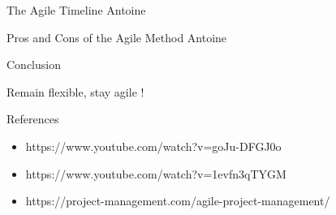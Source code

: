 \documentclass[10pt]{beamer}
\begin{document}
\begin{frame}{The Agile Timeline}
    Antoine
\end{frame}

\begin{frame}{Pros and Cons of the Agile Method}
    Antoine
\end{frame}

\begin{frame}{Conclusion}

  Remain flexible, stay agile !
  
\end{frame}

\begin{frame}{References}
  \begin{itemize}
    \item https://www.youtube.com/watch?v=goJu-DFGJ0o
    \item https://www.youtube.com/watch?v=1evfn3qTYGM
    \item https://project-management.com/agile-project-management/
  \end{itemize}
\end{frame}
\end{document}
